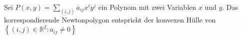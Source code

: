 \begin{definition}
    Sei $P(x, y) = \sum_{(i, j)}{a_{ij} x^i y^j}$ ein Polynom mit zwei Variablen $x$ und $y$.
    Das korrespondierende Newtonpolygon entspricht der konvexen Hülle von $\left\{ (i, j) \in \mathbb{R}^2 \colon a_{ij} \neq 0 \right\}$
\end{definition}
